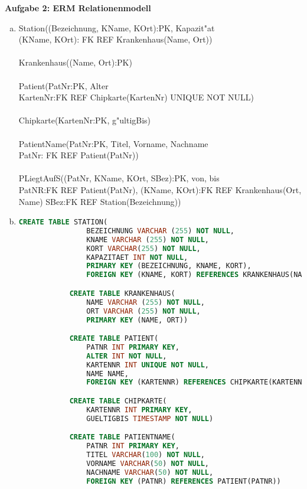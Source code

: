 \documentclass[a4paper,12pt]{article}
\newcommand{\Aufgabe}[1]{
        {
        \vspace*{0.5cm}
        \textbf{Aufgabe #1}
        \vspace*{0.2cm}
    }
}
\begin{document}
    \Aufgabe{2: ERM \textrightarrow Relationenmodell}
    \begin{enumerate}[(a)]
        \item
        Station((Bezeichnung, KName, KOrt):PK, Kapazit"at \\
        (KName, KOrt): FK REF Krankenhaus(Name, Ort)) \\ \\
        Krankenhaus((Name, Ort):PK) \\ \\
        Patient(PatNr:PK, Alter \\
        KartenNr:FK REF Chipkarte(KartenNr) UNIQUE NOT NULL) \\ \\
        Chipkarte(KartenNr:PK, g"ultigBis) \\ \\
        PatientName(PatNr:PK, Titel, Vorname, Nachname \\
        PatNr: FK REF Patient(PatNr)) \\ \\
        PLiegtAufS((PatNr, KName, KOrt, SBez):PK, von, bis \\
        PatNR:FK REF Patient(PatNr), (KName, KOrt):FK REF Krankenhaus(Ort, Name)
        SBez:FK REF Station(Bezeichnung))

        \newpage
        \item
        \begin{lstlisting}[language=SQL]
            CREATE TABLE STATION(
                BEZEICHNUNG VARCHAR (255) NOT NULL,
                KNAME VARCHAR (255) NOT NULL,
                KORT VARCHAR(255) NOT NULL,
                KAPAZITAET INT NOT NULL,
                PRIMARY KEY (BEZEICHNUNG, KNAME, KORT),
                FOREIGN KEY (KNAME, KORT) REFERENCES KRANKENHAUS(NAME, ORT))

            CREATE TABLE KRANKENHAUS(
                NAME VARCHAR (255) NOT NULL,
                ORT VARCHAR (255) NOT NULL,
                PRIMARY KEY (NAME, ORT))

            CREATE TABLE PATIENT(
                PATNR INT PRIMARY KEY,
                ALTER INT NOT NULL,
                KARTENNR INT UNIQUE NOT NULL,
                NAME NAME,
                FOREIGN KEY (KARTENNR) REFERENCES CHIPKARTE(KARTENNR))

            CREATE TABLE CHIPKARTE(
                KARTENNR INT PRIMARY KEY,
                GUELTIGBIS TIMESTAMP NOT NULL)

            CREATE TABLE PATIENTNAME(
                PATNR INT PRIMARY KEY,
                TITEL VARCHAR(100) NOT NULL,
                VORNAME VARCHAR(50) NOT NULL,
                NACHNAME VARCHAR(50) NOT NULL,
                FOREIGN KEY (PATNR) REFERENCES PATIENT(PATNR))


\end{lstlisting}
\end{enumerate}
\end{document}
